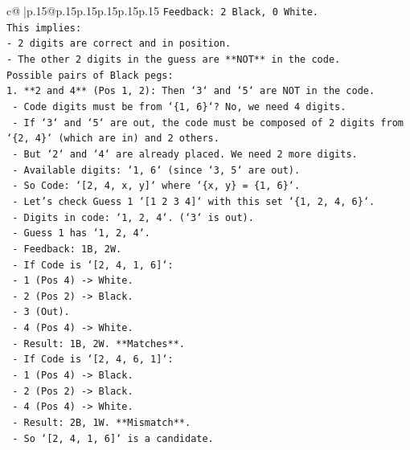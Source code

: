 \documentclass{article}
\begin{document}
{\begin{supertabular}{c@{$\;$}|p{.15\linewidth}@{}p{.15\linewidth}p{.15\linewidth}p{.15\linewidth}p{.15\linewidth}p{.15\linewidth}}
{{{\texttt{Feedback: 2 Black, 0 White.} \\
\texttt{This implies:} \\
\texttt{{-} 2 digits are correct and in position.} \\
\texttt{{-} The other 2 digits in the guess are **NOT** in the code.} \\
\texttt{Possible pairs of Black pegs:} \\
\texttt{1.  **2 and 4** (Pos 1, 2): Then `3` and `5` are NOT in the code.} \\
\texttt{    {-} Code digits must be from `\{1, 6\}`? No, we need 4 digits.} \\
\texttt{    {-} If `3` and `5` are out, the code must be composed of 2 digits from `\{2, 4\}` (which are in) and 2 others.} \\
\texttt{    {-} But `2` and `4` are already placed. We need 2 more digits.} \\
\texttt{    {-} Available digits: `1, 6` (since `3, 5` are out).} \\
\texttt{    {-} So Code: `{[}2, 4, x, y{]}` where `\{x, y\} = \{1, 6\}`.} \\
\texttt{    {-} Let's check Guess 1 `{[}1 2 3 4{]}` with this set `\{1, 2, 4, 6\}`.} \\
\texttt{        {-} Digits in code: `1, 2, 4`. (`3` is out).} \\
\texttt{        {-} Guess 1 has `1, 2, 4`.} \\
\texttt{        {-} Feedback: 1B, 2W.} \\
\texttt{        {-} If Code is `{[}2, 4, 1, 6{]}`:} \\
\texttt{            {-} 1 (Pos 4) {-}> White.} \\
\texttt{            {-} 2 (Pos 2) {-}> Black.} \\
\texttt{            {-} 3 (Out).} \\
\texttt{            {-} 4 (Pos 4) {-}> White.} \\
\texttt{            {-} Result: 1B, 2W. **Matches**.} \\
\texttt{        {-} If Code is `{[}2, 4, 6, 1{]}`:} \\
\texttt{            {-} 1 (Pos 4) {-}> Black.} \\
\texttt{            {-} 2 (Pos 2) {-}> Black.} \\
\texttt{            {-} 4 (Pos 4) {-}> White.} \\
\texttt{            {-} Result: 2B, 1W. **Mismatch**.} \\
\texttt{        {-} So `{[}2, 4, 1, 6{]}` is a candidate.} \\
}}}
\end{supertabular}}
\end{document}
